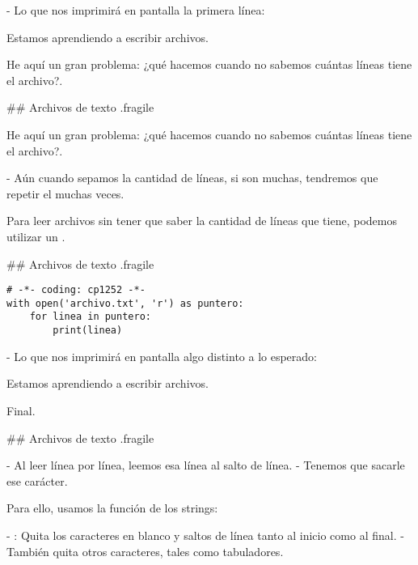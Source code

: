 - Lo que nos imprimirá en pantalla la primera línea:

\begin{exampleFile}
Estamos aprendiendo a escribir archivos.

\end{exampleFile}

\bgnblockdanger
He aquí un gran problema: ¿qué hacemos cuando no sabemos cuántas líneas tiene
el archivo?.
\trmblockdanger

## Archivos de texto {.fragile}


\bgnblockdanger
He aquí un gran problema: ¿qué hacemos cuando no sabemos cuántas líneas tiene
el archivo?.
\trmblockdanger

\pause

- Aún cuando sepamos la cantidad de líneas, si son muchas, tendremos que repetir el 
muchas veces.

\pause

\bgnblockidea
Para leer archivos sin tener que saber la cantidad de líneas que tiene, podemos
utilizar un .
\trmblockidea

## Archivos de texto {.fragile}


\begin{lstlisting}[style=frame02]
# -*- coding: cp1252 -*-
with open('archivo.txt', 'r') as puntero:
    for linea in puntero:
        print(linea)
\end{lstlisting}

- Lo que nos imprimirá en pantalla algo distinto a lo esperado:

\begin{exampleFile}
Estamos aprendiendo a escribir archivos.



Final.

\end{exampleFile}

## Archivos de texto {.fragile}


- Al leer línea por línea, leemos esa línea  al salto de línea.
    - Tenemos que sacarle ese carácter.

\bgnblockidea
Para ello, usamos la función  de los strings:
\trmblockidea

- : Quita los caracteres en blanco y saltos de línea tanto al inicio como al final.
    - También quita otros caracteres, tales como tabuladores.

